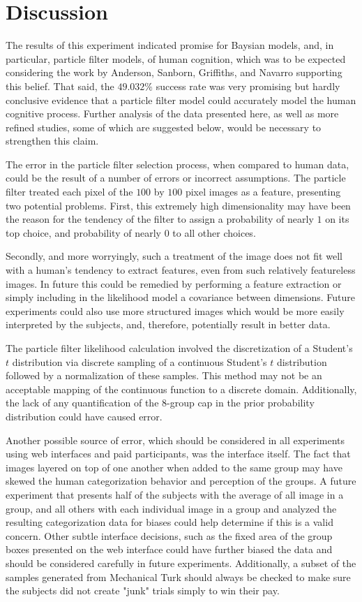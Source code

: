\section{Discussion}
\label{sec:discussion}

The results of this experiment indicated promise for Baysian models, and, in
particular, particle filter models, of human cognition, which was to be expected
considering the work by Anderson, Sanborn, Griffiths, and Navarro supporting
this belief. That said, the $49.032\%$ success rate was very promising but
hardly conclusive evidence that a particle filter model could accurately model
the human cognitive process. Further analysis of the data presented here, as
well as more refined studies, some of which are suggested below, would be
necessary to strengthen this claim.

The error in the particle filter selection process, when compared to human data,
could be the result of a number of errors or incorrect assumptions. The particle
filter treated each pixel of the $100$ by $100$ pixel images as a feature, presenting
two potential problems. First, this extremely high dimensionality may have been
the reason for the tendency of the filter to assign a probability of nearly $1$
on its top choice, and probability of nearly $0$ to all other choices.

Secondly, and more worryingly, such a treatment of the image does not fit well
with a human's tendency to extract features, even from such relatively
featureless images. In future this could be remedied by performing a feature
extraction or simply including in the likelihood model a covariance between
dimensions. Future experiments could also use more structured images which would
be more easily interpreted by the subjects, and, therefore, potentially result
in better data.

The particle filter likelihood calculation involved the discretization of a
Student's $t$ distribution via discrete sampling of a continuous Student's $t$
distribution followed by a normalization of these samples. This method may not
be an acceptable mapping of the continuous function to a discrete domain.
Additionally, the lack of any quantification of the 8-group cap in the prior
probability distribution could have caused error.

Another possible source of error, which should be considered in all experiments
using web interfaces and paid participants, was the interface itself. The fact
that images layered on top of one another when added to the same group may have
skewed the human categorization behavior and perception of the groups. A future
experiment that presents half of the subjects with the average of all image in a group,
and all others with each individual image in a group and analyzed the resulting
categorization data for biases could help determine if this is a valid concern.
Other subtle interface decisions, such as the fixed area of the group boxes presented
on the web interface could have further biased the data and should be considered
carefully in future experiments. Additionally, a subset of the samples generated
from Mechanical Turk should always be checked to make sure the subjects did not
create "junk" trials simply to win their pay.

